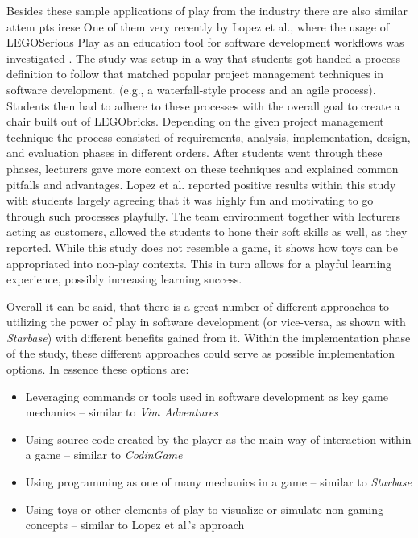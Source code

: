 Besides these sample applications of play from the industry there are also similar attem  pts irese One of them very recently by Lopez et al., where the usage of LEGO\textregistered Serious Play as an education tool for software development workflows was investigated \cite{lopez2021lego}. The study was setup in a way that students got handed a process definition to follow that matched popular project management techniques in software development. (e.g., a waterfall-style process and an agile process). Students then had to adhere to these processes with the overall goal to create a chair built out of LEGO\textregistered bricks. Depending on the given project management technique the process consisted of requirements, analysis, implementation, design, and evaluation phases in different orders. After students went through these phases, lecturers gave more context on these techniques and explained common pitfalls and advantages. Lopez et al. reported positive results within this study with students largely agreeing that it was highly fun and motivating to go through such processes playfully. The team environment together with lecturers acting as customers, allowed the students to hone their soft skills as well, as they reported. While this study does not resemble a game, it shows how toys can be appropriated into non-play contexts. This in turn allows for a playful learning experience, possibly increasing learning success.

Overall it can be said, that there is a great number of different approaches to utilizing the power of play in software development (or vice-versa, as shown with \textit{Starbase}) with different benefits gained from it. Within the implementation phase of the study, these different approaches could serve as possible implementation options. In essence these options are:

\begin{itemize}
  \item{Leveraging commands or tools used in software development as key game mechanics -- similar to \textit{Vim Adventures}}
  \item{Using source code created by the player as the main way of interaction within a game -- similar to \textit{CodinGame}}
  \item{Using programming as one of many mechanics in a game -- similar to \textit{Starbase}}
  \item{Using toys or other elements of play to visualize or simulate non-gaming concepts -- similar to Lopez et al.'s approach}
\end{itemize}

